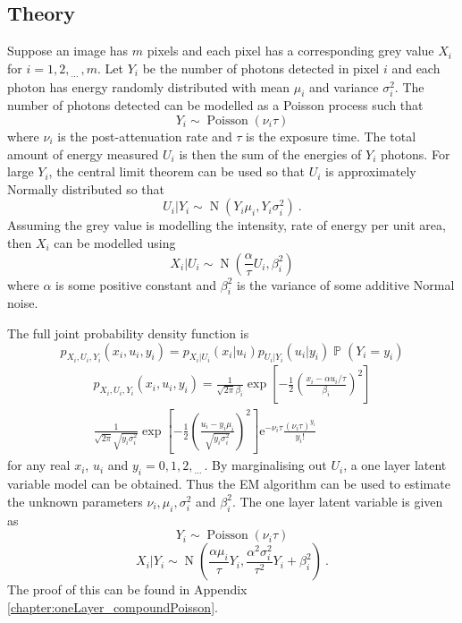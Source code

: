 \documentclass[12pt]{report}
\DeclareMathOperator{\prob}{\mathbb{P}}
\DeclareMathOperator{\normal}{N}
\DeclareMathOperator{\poisson}{Poisson}
\newcommand{\euler}{\mathrm{e}}
\newcommand{\dotdotdot}{_{\phantom{.}\cdots}}
\begin{document}
\subsection{Theory}
Suppose an image has $m$ pixels and each pixel has a corresponding grey value $X_i$ for $i=1,2,\dotdotdot,m$. Let $Y_i$ be the number of photons detected in pixel $i$ and each photon has energy randomly distributed with mean $\mu_i$ and variance $\sigma_i^2$. The number of photons detected can be modelled as a Poisson process such that
\begin{equation}
Y_i\sim\poisson(\nu_i \tau)
\end{equation}
where $\nu_i$ is the post-attenuation rate and $\tau$ is the exposure time. The total amount of energy measured $U_i$ is then the sum of the energies of $Y_i$ photons. For large $Y_i$, the central limit theorem can be used so that $U_i$ is approximately Normally distributed so that
\begin{equation}
U_i|Y_i\sim\normal\left(
Y_i\mu_i,Y_i\sigma_i^2
\right) \ .
\end{equation}
Assuming the grey value is modelling the intensity, rate of energy per unit area, then $X_i$ can be modelled using
\begin{equation}
X_i|U_i\sim\normal\left(
\frac{\alpha}{\tau}U_i,\beta_i^2
\right)
\end{equation}
where $\alpha$ is some positive constant and $\beta_i^2$ is the variance of some additive Normal noise.
 
The full joint probability density function is
\begin{equation*}
p_{X_i,U_i,Y_i}\left(x_i,u_i,y_i\right)=
p_{X_i|U_i}(x_i|u_i)p_{U_i|Y_i}(u_i|y_i)\prob(Y_i=y_i)
\end{equation*}
\begin{multline}
p_{X_i,U_i,Y_i}\left(x_i,u_i,y_i\right)=
\frac{1}{\sqrt{2\pi}\beta_i}\exp\left[-\frac{1}{2}\left(\frac{x_i-\alpha u_i /\tau}{\beta_i}\right)^2\right]
\\
\frac{1}{\sqrt{2\pi}\sqrt{y_i\sigma_i^2}}\exp\left[-\frac{1}{2}\left(\frac{u_i-y_i\mu_i}{\sqrt{y_i\sigma_i^2}}\right)^2\right]
\euler^{-\nu_i\tau}\frac{(\nu_i\tau)^{y_i}}{y_i!}
\end{multline}
for any real $x_i$, $u_i$ and $y_i=0,1,2,\dotdotdot$.
By marginalising out $U_i$, a one layer latent variable model can be obtained. Thus the EM algorithm \cite[pp.~260-261]{barber2012bayesian} can be used to estimate the unknown parameters $\nu_i,\mu_i,\sigma_i^2$ and $\beta_i^2$. The one layer latent variable is given as
\begin{equation}
Y_i\sim\poisson(\nu_i\tau)
\end{equation}
\begin{equation}
X_i|Y_i\sim\normal\left(
\frac{\alpha\mu_i}{\tau}Y_i,\frac{\alpha^2\sigma_i^2}{\tau^2}Y_i+\beta_i^2
\right) \ .
\end{equation}
The proof of this can be found in Appendix \ref{chapter:oneLayer_compoundPoisson}.
\end{document}

